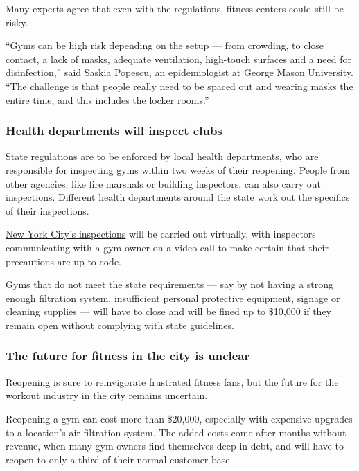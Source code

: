 Many experts agree that even with the regulations, fitness centers could
still be risky.

``Gyms can be high risk depending on the setup --- from crowding, to
close contact, a lack of masks, adequate ventilation, high-touch
surfaces and a need for disinfection,'' said Saskia Popescu, an
epidemiologist at George Mason University. ``The challenge is that
people really need to be spaced out and wearing masks the entire time,
and this includes the locker rooms.''

\hypertarget{health-departments-will-inspect-clubs}{%
\subsubsection{Health departments will inspect
clubs}\label{health-departments-will-inspect-clubs}}

State regulations are to be enforced by local health departments, who
are responsible for inspecting gyms within two weeks of their reopening.
People from other agencies, like fire marshals or building inspectors,
can also carry out inspections. Different health departments around the
state work out the specifics of their inspections.

\href{https://www1.nyc.gov/assets/doh/downloads/pdf/covid/businesses/covid-19-reopening-gyms.pdf}{New
York City's inspections} will be carried out virtually, with inspectors
communicating with a gym owner on a video call to make certain that
their precautions are up to code.

Gyms that do not meet the state requirements --- say by not having a
strong enough filtration system, insufficient personal protective
equipment, signage or cleaning supplies --- will have to close and will
be fined up to \$10,000 if they remain open without complying with state
guidelines.

\hypertarget{the-future-for-fitness-in-the-city-is-unclear}{%
\subsubsection{The future for fitness in the city is
unclear}\label{the-future-for-fitness-in-the-city-is-unclear}}

Reopening is sure to reinvigorate frustrated fitness fans, but the
future for the workout industry in the city remains uncertain.

Reopening a gym can cost more than \$20,000, especially with expensive
upgrades to a location's air filtration system. The added costs come
after months without revenue, when many gym owners find themselves deep
in debt, and will have to reopen to only a third of their normal
customer base.

